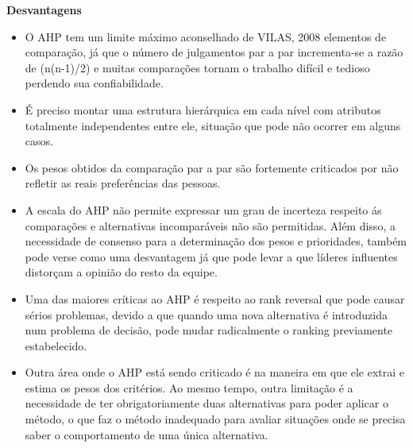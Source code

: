 \documentclass[12pt]{article}[abntex2]
\begin{document}
\newpage
\begin{center}
\textbf{\Large{Desvantagens}}\\
\end{center}
\begin{multicols}{2}
        \begin{itemize} 
        \item O AHP tem um limite máximo aconselhado
        de VILAS, 2008 elementos de comparação, já
        que o número de julgamentos par a par
        incrementa-se a razão de (n(n-1)/2) e muitas
        comparações tornam o trabalho difícil e tedioso
        perdendo sua confiabilidade. \cite{salomon1999justificativas,morita1999modelos,gomes2003conceitos,guglielmetti2003comparaccao}
        \item É preciso montar uma estrutura hierárquica
        em cada nível com atributos totalmente
        independentes entre ele, situação que pode não
        ocorrer em alguns casos. \cite{liu2008access,saaty2013analytic}
        \item Os pesos obtidos da comparação par a par
        são fortemente criticados por não refletir as
        reais preferências das pessoas. \cite{linkov2008appendix}
        \item A escala do AHP não permite expressar um
        grau de incerteza respeito ás comparações e
        alternativas incomparáveis não são permitidas.
        Além disso, a necessidade de consenso para a
        determinação dos pesos e prioridades, também
        pode verse como uma desvantagem já que pode
        levar a que líderes influentes distorçam a
        opinião do resto da equipe. \cite{kangas2005multiple, VilasAnalise}
        \item Uma das maiores críticas ao AHP é respeito
        ao rank reversal que pode causar sérios
        problemas, devido a que quando uma nova
        alternativa é introduzida num problema de
        decisão, pode mudar radicalmente o ranking
        previamente estabelecido. \cite{kangas2005multiple,boucher1997comparison}
        \item Outra área onde o AHP está sendo criticado
        é na maneira em que ele extrai e estima os
        pesos dos critérios. Ao mesmo tempo, outra
        limitação é a necessidade de ter
        obrigatoriamente duas alternativas para poder
        aplicar o método, o que faz o método
        inadequado para avaliar situações onde se
        precisa saber o comportamento de uma única
        alternativa. \cite{boucher1997comparison}
        \end{itemize} 
\end{multicols}
\end{document}
